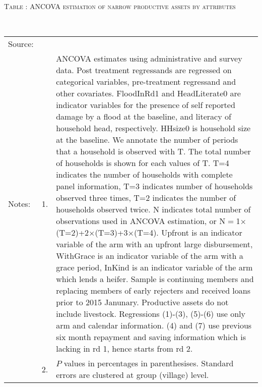 \hspace{-1cm}\begin{minipage}[t]{14cm}
\hfil\textsc{\normalsize Table \thetable: ANCOVA estimation of narrow productive assets by attributes\label{tab ANCOVA narrow productive assets attributes}}\\
\setlength{\tabcolsep}{1pt}
\setlength{\baselineskip}{8pt}
\renewcommand{\arraystretch}{.55}
\hfil{}\\
\renewcommand{\arraystretch}{.8}
\setlength{\tabcolsep}{1pt}
\begin{tabular}{>{\hfill\scriptsize}p{1cm}<{}>{\hfill\scriptsize}p{.25cm}<{}>{\scriptsize}p{12cm}<{\hfill}}
Source:& \multicolumn{2}{l}{\scriptsize Estimated with GUK administrative and survey data.}\\
Notes: & 1. & ANCOVA estimates using administrative and survey data. Post treatment regressands are regressed on categorical variables, pre-treatment regressand and other covariates. \textsf{FloodInRd1} and \textsf{HeadLiterate0} are indicator variables for the presence of self reported damage by a flood at the baseline, and literacy of household head, respectively. \textsf{HHsize0} is household size at the baseline. We annotate the number of periods that a household is observed with \textsf{T}. The total number of households is shown for each values of \textsf{T}. \textsf{T=4} indicates the number of households with complete panel information, \textsf{T=3} indicates number of households observed three times, \textsf{T=2} indicates the number of households observed twice. \textsf{N} indicates total number of observations used in ANCOVA estimation, or \textsf{N$=$1$\times$(T=2)+2$\times$(T=3)+3$\times$(T=4)}.  \textsf{Upfront} is an indicator variable of the arm with an upfront large disbursement, \textsf{WithGrace} is an indicator variable of the arm with a grace period, \textsf{InKind} is an indicator variable of the arm which lends a heifer. Sample is continuing members and replacing members of early rejecters and received loans prior to 2015 Janunary. Productive assets do not include livestock. Regressions (1)-(3), (5)-(6) use only arm and calendar information. (4) and (7) use previous six month repayment and saving information which is lacking in rd 1, hence starts from rd 2.\\
& 2. & $P$ values in percentages in parenthesises. Standard errors are clustered at group (village) level.
\end{tabular}
\end{minipage}

